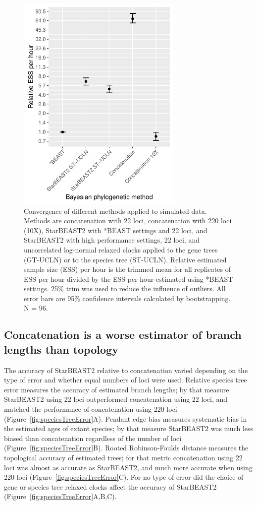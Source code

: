 \documentclass[nogrid]{MBE}%
\begin{document}
\begin{figure}[htb!]
\centering
\includegraphics[width=8cm]{minimum_relative_ess_per_hour.pdf}
\caption
{Convergence of different methods applied to simulated data. Methods are
concatenation with 22 loci, concatenation with 220 loci (10X), StarBEAST2 with
*BEAST settings and 22 loci, and StarBEAST2 with high performance settings, 22 loci,
and uncorrelated log-normal relaxed clocks applied to the gene trees (GT-UCLN) or
to the species tree (ST-UCLN). Relative estimated sample size (ESS) per hour is the trimmed mean for all replicates of
ESS per hour divided by the ESS per hour estimated using *BEAST
settings. 25\% trim was used to reduce the influence of
outliers. All error bars are 95\% confidence intervals calculated by
bootstrapping. N = 96.}
\label{fig:simulatedEssPerHour}
\end{figure}

\subsection{Concatenation is a worse estimator of branch lengths than topology}

The accuracy of StarBEAST2 relative to concatenation varied depending on the
type of error and whether equal numbers of loci were used. Relative species tree
error measures the accuracy of estimated branch lengths; by that measure
StarBEAST2 using 22 loci outperformed concatenation using 22 loci, and matched
the performance of concatenation using 220 loci
(Figure~\ref{fig:speciesTreeError}A). Pendant edge bias measures systematic bias
in the estimated ages of extant species; by that measure StarBEAST2 was much
less biased than concatenation regardless of the number of loci
(Figure~\ref{fig:speciesTreeError}B). Rooted Robinson-Foulds distance measures
the topological accuracy of estimated trees; for that metric concatenation using
22 loci was almost as accurate as StarBEAST2, and much more accurate when using
220 loci (Figure~\ref{fig:speciesTreeError}C). For no type of error did the
choice of gene or species tree relaxed clocks affect the accuracy of StarBEAST2
(Figure~\ref{fig:speciesTreeError}A,B,C).
\end{document}
